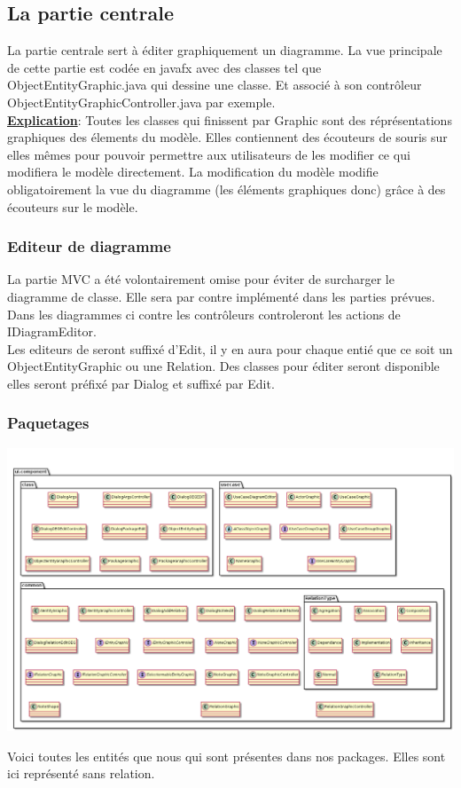 \documentclass[a4paper,10pt]{article}
\begin{document}
  \subsection{La partie centrale}
    La partie centrale sert à éditer graphiquement un diagramme. La vue principale de cette partie est codée en javafx avec 
    des classes tel que ObjectEntityGraphic.java qui dessine une classe. Et
    associé à son contrôleur ObjectEntityGraphicController.java par exemple.\\
    
    \textbf{\underline{Explication}}: Toutes les classes qui finissent par Graphic sont des réprésentations graphiques des élements du modèle. Elles contiennent
    des écouteurs de souris sur elles mêmes pour pouvoir permettre aux utilisateurs de les modifier ce qui modifiera le modèle directement.
    La modification du modèle modifie obligatoirement la vue du diagramme (les éléments graphiques donc) grâce à des écouteurs sur le modèle.
    \newpage
    \subsubsection{Editeur de diagramme}
	La partie MVC a été volontairement omise pour éviter de surcharger le diagramme de classe. Elle sera 
	par contre implémenté dans les parties prévues.\\
	Dans les diagrammes ci contre les contrôleurs controleront les actions de IDiagramEditor.\\
	Les editeurs de seront suffixé d'Edit, il y en aura pour chaque entié que ce soit un ObjectEntityGraphic ou
	une Relation. Des classes pour éditer seront disponible elles seront préfixé par Dialog et suffixé par
	Edit.
	\subsubsection{Paquetages}
	
	  \begin{center}
	      \includegraphics[width=\textwidth]{DiagrammesVueVersion1erLivrable/DiagramEditor_EntityPackage3.png}
	  \end{center}
	  Voici toutes les entités que nous qui sont présentes dans nos packages. Elles sont ici représenté sans relation.
	  \newpage
\end{document}
